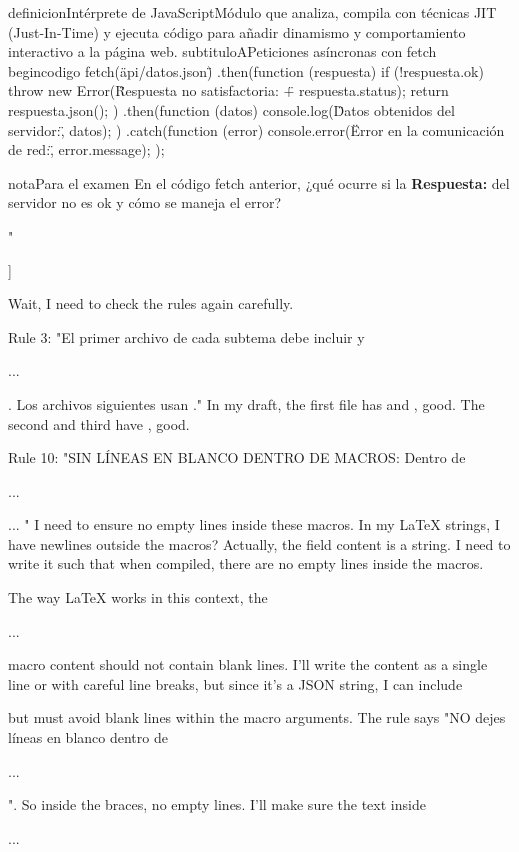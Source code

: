 
definicion{Intérprete de JavaScript}{Módulo que analiza, compila con técnicas JIT (Just-In-Time) y ejecuta código para añadir dinamismo y comportamiento interactivo a la página web.}
subtituloA{Peticiones asíncronas con fetch}
begin{codigo}
fetch(\"api/datos.json\")
  .then(function (respuesta) {
    if (!respuesta.ok) throw new Error(\"Respuesta no satisfactoria: \" + respuesta.status);
    return respuesta.json();
  })
  .then(function (datos) {
    console.log(\"Datos obtenidos del servidor:\", datos);
  })
  .catch(function (error) {
    console.error(\"Error en la comunicación de red:\", error.message);
  });




 nota{Para el examen}{ En el código fetch anterior, ¿qué ocurre si la \textbf{Respuesta:} del servidor no es ok y cómo se maneja el error? }

"

  ]

Wait, I need to check the rules again carefully.

Rule 3: "El primer archivo de cada subtema debe incluir  y 

...

. Los archivos siguientes usan ." In my draft, the first file has \cmd{\secciongrande} and \cmd{\resumen}, good. The second and third have \cmd{\subtituloA}, good.

Rule 10: "SIN LÍNEAS EN BLANCO DENTRO DE MACROS: Dentro de 

...

{
... " I need to ensure no empty lines inside these macros. In my LaTeX strings, I have newlines outside the macros? Actually, the  field content is a string. I need to write it such that when compiled, there are no empty lines inside the macros.

The way LaTeX works in this context, the \cmd{}

...

 macro content should not contain blank lines. I'll write the content as a single line or with careful line breaks, but since it's a JSON string, I can include \cmd{}
} but must avoid blank lines within the macro arguments. The rule says "NO dejes líneas en blanco dentro de \

...

". So inside the braces, no empty lines. I'll make sure the text inside \cmd{}

...

